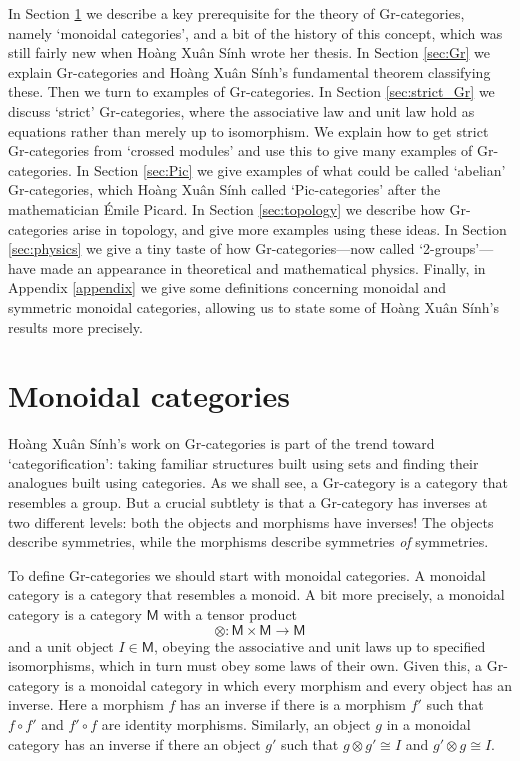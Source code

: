 \documentclass[reqno]{amsart}
\newcommand{\M}{{\mathsf{M}}}   %
\theoremstyle{definition}
\begin{document}
In Section \ref{sec:monoidal} we describe a key prerequisite for the theory of Gr-categories, namely `monoidal categories', and a bit of the history of this concept, which was still fairly new when Ho\`ang Xu\^an S\'inh wrote her thesis.  In Section \ref{sec:Gr} we explain Gr-categories and Ho\`ang Xu\^an S\'inh's fundamental theorem classifying these.  Then we turn to examples of Gr-categories.   In Section \ref{sec:strict_Gr} we discuss `strict' Gr-categories, where the associative law and unit law hold as equations rather than merely up to isomorphism.  We explain how to get strict Gr-categories from `crossed modules' and use this to give many examples of Gr-categories.  In Section \ref{sec:Pic} we give examples of what could be called `abelian' Gr-categories, which Ho\`ang Xu\^an S\'inh called `Pic-categories' after the mathematician \'Emile Picard.   In Section \ref{sec:topology} we describe how Gr-categories arise in topology, and give more examples using these ideas.   In Section \ref{sec:physics} we give a tiny taste of how Gr-categories---now called `2-groups'---have made an appearance in theoretical and mathematical physics.   Finally, in Appendix \ref{appendix} we give some definitions concerning monoidal and symmetric monoidal categories, allowing us to state some of Ho\`ang Xu\^an S\'inh's results more precisely.

\section{Monoidal categories}
\label{sec:monoidal}

Ho\`ang Xu\^an S\'inh's work on Gr-categories is part of the trend toward `categorification': taking familiar structures built using sets and finding their analogues built using categories.   As we shall see, a  Gr-category is a category that resembles a group.  But a crucial subtlety is that a Gr-category has inverses at two different levels: both the objects and morphisms have inverses!  The objects describe symmetries, while the morphisms describe symmetries \emph{of} symmetries.

To define Gr-categories we should start with monoidal categories.  A monoidal category is a category that resembles a monoid.   A bit more precisely, a monoidal category is a category $\M$ with a tensor product
\[           \otimes \colon \M \times \M \to \M \]
and a unit object $I \in \M$, obeying  the associative and unit laws up to specified isomorphisms, which in turn must obey some laws of their own.   Given this, a Gr-category is a monoidal category in which every morphism and every object has an inverse.   Here a morphism $f$ has an inverse if there is a morphism $f'$ such that $f \circ f'$ and $f' \circ f$ are identity morphisms.  Similarly, an object $g$ in a monoidal category has an inverse if there an object $g'$ such that $g \otimes g' \cong I$ and $g' \otimes g \cong I$.
\end{document}
